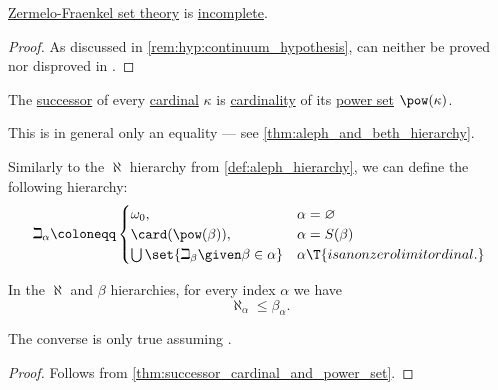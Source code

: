 \begin{theorem}\label{thm:zfc_incompleteness}
  \hyperref[def:zfc]{Zermelo-Fraenkel set theory} is \hyperref[def:fol_theory/complete]{incomplete}.
\end{theorem}
\begin{proof}
  As discussed in \cref{rem:hyp:continuum_hypothesis},  can neither be proved nor disproved in .
\end{proof}

\begin{conjecture}\label{hyp:generalized_continuum_hypothesis}
  The \hyperref[def:ordinal_successor]{successor} of every \hyperref[def:cardinal]{cardinal} \( \kappa \) is \hyperref[def:cardinality]{cardinality} of its \hyperref[def:power_set]{power set} \( \pow(\kappa) \).
\end{conjecture}
\begin{comments}
  \item This is in general only an equality --- see \cref{thm:aleph_and_beth_hierarchy}.
\end{comments}

\begin{definition}\label{def:beth_hierarchy}
  Similarly to the \( \aleph \) hierarchy from \cref{def:aleph_hierarchy}, we can define the following hierarchy:
  \begin{equation*}
    \beth_\alpha \coloneqq \begin{cases}
      \omega_0,                                          &\alpha = \varnothing \\
      \card(\pow(\beta)),                                &\alpha = S(\beta) \\
      \bigcup\set{ \beth_\beta \given \beta \in \alpha } &\alpha \T{is a nonzero limit ordinal.}
    \end{cases}
  \end{equation*}
\end{definition}

\begin{proposition}\label{thm:aleph_and_beth_hierarchy}
  In the \( \aleph \) and \( \beta \) hierarchies, for every index \( \alpha \) we have
  \begin{equation*}
    \aleph_\alpha \leq \beta_\alpha.
  \end{equation*}
\end{proposition}
\begin{comments}
  \item The converse is only true assuming .
\end{comments}
\begin{proof}
  Follows from \cref{thm:successor_cardinal_and_power_set}.
\end{proof}

